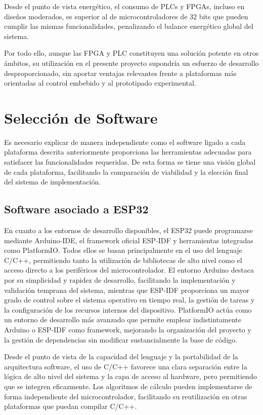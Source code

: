 Desde el punto de vista energético, el consumo de PLCs y FPGAs, incluso en diseños moderados, es superior al de microcontroladores de 32 bits que pueden cumplir las mismas funcionalidades, penalizando el balance energético global del sistema.

Por todo ello, aunque las FPGA y PLC constituyen una solución potente en otros ámbitos, su utilización en el presente proyecto supondría un esfuerzo de desarrollo desproporcionado, sin aportar ventajas relevantes frente a plataformas más orientadas al control embebido y al prototipado experimental.


\section{Selección de Software}

Es necesario explicar de manera independiente como el software ligado a cada plataforma descrita anteriormente proporciona las herramientas adecuadas para satisfacer las funcionalidades requeridas. De esta forma se tiene una visión global de cada plataforma, facilitando la comparación de viabilidad y la elección final del sistema de implementación.


\subsection{Software asociado a ESP32}

En cuanto a los entornos de desarrollo disponibles, el ESP32 puede programarse mediante Arduino-IDE, el framework oficial ESP-IDF y herramientas integradas como PlatformIO. Todos ellos se basan principalmente en el uso del lenguaje C/C++, permitiendo tanto la utilización de bibliotecas de alto nivel como el acceso directo a los periféricos del microcontrolador. El entorno Arduino destaca por su simplicidad y rapidez de desarrollo, facilitando la implementación y validación temprana del sistema, mientras que ESP-IDF proporciona un mayor grado de control sobre el sistema operativo en tiempo real, la gestión de tareas y la configuración de los recursos internos del dispositivo. PlatformIO actúa como un entorno de desarrollo más avanzado que permite emplear indistintamente Arduino o ESP-IDF como framework, mejorando la organización del proyecto y la gestión de dependencias sin modificar sustancialmente la base de código.

Desde el punto de vista de la capacidad del lenguaje y la portabilidad de la arquitectura software, el uso de C/C++ favorece una clara separación entre la lógica de alto nivel del sistema y la capa de acceso al hardware, pero permitiendo que se integren eficazmente. Los algoritmos de cálculo pueden implementarse de forma independiente del microcontrolador, facilitando su reutilización en otras plataformas que puedan compilar C/C++. 

